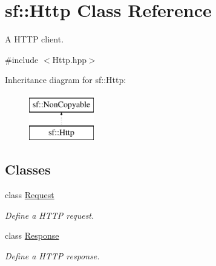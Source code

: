 \hypertarget{classsf_1_1_http}{}\section{sf\+:\+:Http Class Reference}
\label{classsf_1_1_http}


A H\+T\+TP client.  




{\ttfamily \#include $<$Http.\+hpp$>$}

Inheritance diagram for sf\+:\+:Http\+:\begin{figure}[H]
\begin{center}
\leavevmode
\includegraphics[height=2.000000cm]{classsf_1_1_http}
\end{center}
\end{figure}
\subsection*{Classes}
\begin{DoxyCompactItemize}
\item 
class \mbox{\hyperlink{classsf_1_1_http_1_1_request}{Request}}
\begin{DoxyCompactList}\small\item\em Define a H\+T\+TP request. \end{DoxyCompactList}\item 
class \mbox{\hyperlink{classsf_1_1_http_1_1_response}{Response}}
\begin{DoxyCompactList}\small\item\em Define a H\+T\+TP response. \end{DoxyCompactList}\end{DoxyCompactItemize}
